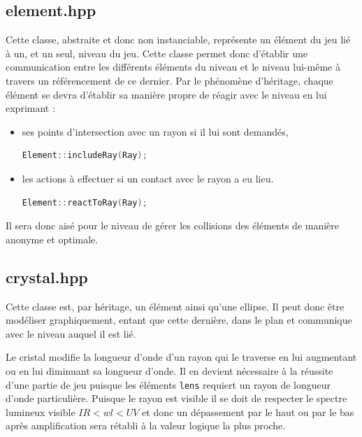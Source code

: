 \documentclass[a4paper,11pt]{report}
\begin{document}
\subsection[Element]{element.hpp}
Cette classe, abstraite et donc non instanciable, représente un élément du jeu
lié à un, et un seul, niveau du jeu. Cette classe permet donc d'établir une
communication entre les différents éléments du niveau et le niveau lui-même à
travers un référencement de ce dernier.
Par le phénomène d'héritage, chaque élément se devra d'établir sa manière propre de
réagir avec le niveau en lui exprimant : 
\begin{itemize}
	\item ses points d'intersection avec un rayon si il lui sont demandés,
		\begin{lstlisting}[language=C++]
		Element::includeRay(Ray);
		\end{lstlisting}
	\item les actions à effectuer si un contact avec le rayon a eu lieu.
		\begin{lstlisting}[language=C++]
		Element::reactToRay(Ray);
		\end{lstlisting}
\end{itemize}
Il sera donc aisé pour le niveau de gérer les collisions des éléments de manière
anonyme et optimale.
\subsection[Cristal]{crystal.hpp}
\begin{center}
\end{center}
Cette classe est, par héritage, un élément ainsi qu'une ellipse. Il peut donc
être modéliser graphiquement, entant que cette dernière, dans le plan et communique avec
le niveau auquel il est lié. 

Le cristal modifie la longueur d'onde d'un rayon qui le traverse en lui
augmentant ou en lui diminuant sa longueur d'onde. Il en devient nécessaire à la
réussite d'une partie de jeu puisque les éléments \texttt{lens} requiert un
rayon de longueur d'onde particulière. Puisque le rayon est visible il se doit
de respecter le spectre lumineux visible $IR < wl < UV$ et donc un dépassement
par le haut ou par le bas après amplification sera rétabli à la valeur logique 
la plus proche.
\end{document}
